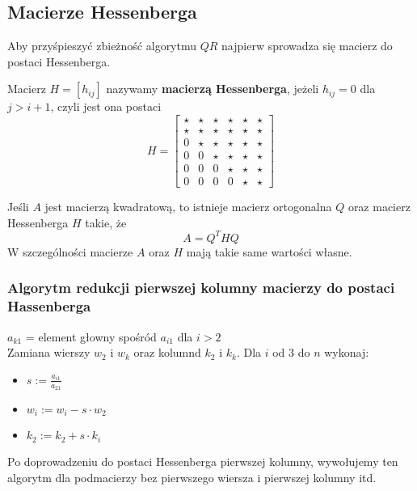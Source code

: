 \documentclass[../mn-notatki.tex]{subfiles}
\begin{document}
\subsection{Macierze Hessenberga}

Aby przyśpieszyć zbieżność algorytmu $QR$ najpierw sprowadza się macierz
do postaci Hessenberga.

\begin{tcolorbox}
Macierz $H = [h_{ij}]$ nazywamy \textbf{macierzą Hessenberga}, jeżeli
$h_{ij} = 0$ dla $j > i + 1$, czyli jest ona postaci
\[
    H = \left[ \begin{smallmatrix}
    \star & \star & \star & \star & \star & \star\\
    \star & \star & \star & \star & \star & \star\\
    0 & \star & \star & \star & \star & \star\\
    0 & 0 & \star & \star & \star & \star\\
    0 & 0 & 0 & \star & \star & \star\\
    0 & 0 & 0 & 0 & \star & \star
    \end{smallmatrix} \right]
\]
\end{tcolorbox}

\begin{tcolorbox}
Jeśli $A$ jest macierzą kwadratową, to istnieje macierz ortogonalna $Q$ oraz
macierz Hessenberga $H$ takie, że
\[
A = Q^T H Q
\]
W szczególności macierze $A$ oraz $H$ mają takie same wartości własne.
\end{tcolorbox}

\subsubsection{Algorytm redukcji pierwszej kolumny macierzy do postaci
Hassenberga}

\begin{tcolorbox}
$a_{k1}$ = element głowny spośród $a_{i1}$ dla $i > 2$\\
Zamiana wierszy $w_2$ i $w_k$ oraz kolumnd $k_2$ i $k_k$.
Dla $i$ od $3$ do $n$ wykonaj:
\begin{itemize}
    \item $s := \frac{a_{i1}}{a_{21}} $
    \item $w_i := w_i - s \cdot w_2$
    \item $k_2 := k_2 + s\cdot k_i$
\end{itemize}
\end{tcolorbox}

Po doprowadzeniu do postaci Hessenberga pierwszej kolumny, wywołujemy ten
algorytm dla podmacierzy bez pierwszego wiersza i pierwszej kolumny itd.
\end{document}
